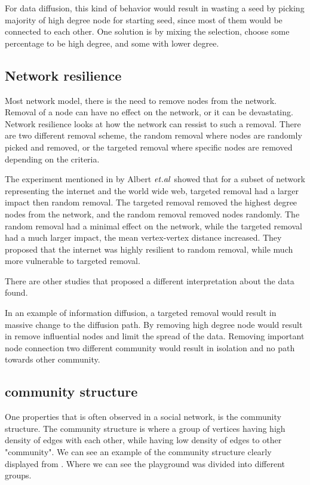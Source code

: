For data diffusion, this kind of behavior would result in wasting a seed by picking majority of high degree node for starting seed, since most of them would be connected to each other. One solution is by mixing the selection, choose some percentage to be high degree, and some with lower degree.

\subsection{Network resilience}
Most network model, there is the need to remove nodes from the network. Removal of a node can have no effect on the network, or it can be devastating. Network resilience looks at how the network can ressist to such a removal. There are two different removal scheme, the random removal where nodes are randomly picked and removed, or the targeted removal where specific nodes are removed depending on the criteria. 

The experiment mentioned in \cite{complexNetwork} by Albert $\it{et. al}$ showed that for a subset of network representing the internet and the world wide web, targeted removal had a larger impact then random removal. The targeted removal removed the highest degree nodes from the network, and the random removal removed nodes randomly. The random removal had a minimal effect on the network, while the targeted removal had a much larger impact, the mean vertex-vertex distance increased. They proposed that the internet was highly resilient to random removal, while much more vulnerable to targeted removal. 

There are other studies that proposed a different interpretation about the data found.	

In an example of information diffusion, a targeted removal would result in massive change to the diffusion path. By removing high degree node would result in remove influential nodes and limit the spread of the data. Removing important node connection two different community would result in isolation and no path towards other community.

\subsection{community structure}
One properties that is often observed in a social network, is the community structure. The community structure is where a group of vertices having high density of edges with each other, while having low density of edges to other "community". We can see an example of the community structure clearly displayed from \cite{RaceSchool2001}. Where we can see the playground was divided into different groups.

